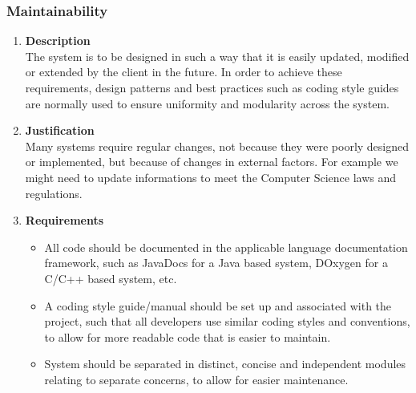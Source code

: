 \documentclass[a4paper,10pt]{article}
\begin{document}
	\subsubsection{Maintainability}
		\begin{enumerate}
			\item \textbf{Description} \\
				The system is to be designed in such a way that it is easily updated, modified or extended by the client in the future. In order to achieve these requirements, design patterns and best practices such as coding style guides are normally used to ensure uniformity and modularity across the system.

			\item \textbf{Justification} \\
				Many systems require regular changes, not because they were poorly designed or implemented, but because of changes in external factors. For example we might need to update informations to meet the Computer Science laws and regulations.

			\item \textbf{Requirements}\\
				\begin{itemize}
					\item All code should be documented in the applicable language documentation framework, such as JavaDocs for a Java based system, DOxygen for a C/C++ based system, etc.
					\item A coding style guide/manual should be set up and associated with the project, such that all developers use similar coding styles and conventions, to allow for more readable code that is easier to maintain.
					\item System should be separated in distinct, concise and independent modules relating to separate concerns, to allow for easier maintenance.
				\end{itemize}
		\end{enumerate}
\end{document}
